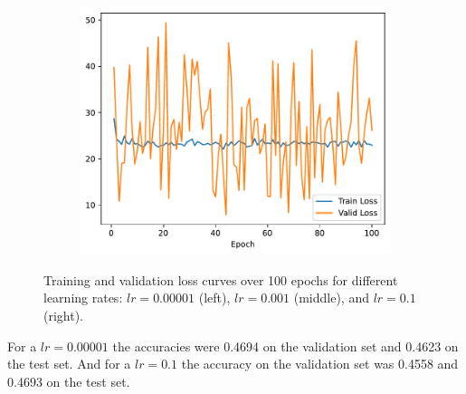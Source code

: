 \documentclass[a4paper, 12pt]{article}
\begin{document}
\begin{figure}[H]
\begin{subfigure}{0.30
    \textwidth}
        \label{fig:lr_0.001}
    \end{subfigure}
    \hfill
    \begin{subfigure}{0.30
    \textwidth}
        \includegraphics[width=\textwidth]{plot/logistic_regression-training-loss-batch-32-lr-0.1-epochs-100-l2-0.01-opt-sgd.pdf}
        \label{fig:lr_0.01}
    \end{subfigure}
    \vspace{-0.6cm}
    \caption{Training and validation loss curves over 100 epochs for different learning rates: \(lr = 0.00001\) (left), \(lr = 0.001\) (middle), and \(lr = 0.1\) (right).}
    \label{fig:q2_1}
\end{figure}

For a $lr = 0.00001$ the accuracies were 0.4694 on the validation set and 0.4623 on the test set. And for a $lr = 0.1$ the accuracy on the validation set was 0.4558 and 0.4693 on the test set.  
\end{document}
